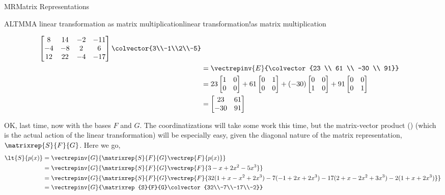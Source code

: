 \begin{subsect}{MR}{Matrix Representations}
\begin{example}{ALTMM}{A linear transformation as matrix multiplication}{linear transformation!as matrix multiplication}
\begin{para}
\begin{align*}
{\begin{bmatrix}
 8 & 14 & -2 & -11 \\
 -4 & -8 & 2 & 6 \\
 12 & 22 & -4 & -17
\end{bmatrix}
\colvector{3\\-1\\2\\-5}
}\\
%
&=\vectrepinv{E}{\colvector{23 \\ 61 \\ -30 \\ 91}}\\
%
&=
23\begin{bmatrix}1&0\\0&0\end{bmatrix}+
61\begin{bmatrix}0&1\\0&0\end{bmatrix}+
(-30)\begin{bmatrix}0&0\\1&0\end{bmatrix}+
91\begin{bmatrix}0&0\\0&1\end{bmatrix}\\
%
&=
\begin{bmatrix}
23 & 61 \\ -30 & 91
\end{bmatrix}
\end{align*}
\end{para}
%
\begin{para}OK, last time, now with the bases $F$ and $G$.  The coordinatizations will take some work this time, but the matrix-vector product () (which is the actual action of the linear transformation) will be especially easy, given the diagonal nature of the matrix representation, $\matrixrep{S}{F}{G}$.  Here we go,
\begin{align*}
\lt{S}{p(x)}
&=\vectrepinv{G}{\matrixrep{S}{F}{G}\vectrep{F}{p(x)}}\\
%
&=\vectrepinv{G}{\matrixrep{S}{F}{G}\vectrep{F}{3-x+2x^2-5x^3}}\\
%
&=\vectrepinv{G}{\matrixrep{S}{F}{G}\vectrep{F}{
32(1+x-x^2+2x^3)
-7(-1+2x+2x^3)
-17(2+x-2x^2+3x^3)
-2(1+x+2x^3)
}}\\
%
&=\vectrepinv{G}{\matrixrep{S}{F}{G}\colvector{32\\-7\\-17\\-2}}\\

\end{align*}
\end{para}
\end{example}
\end{subsect}
